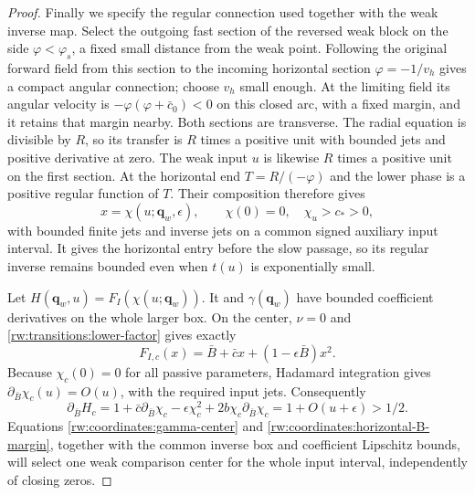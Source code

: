 \begin{proof}
Finally we specify the regular connection used together with the
weak inverse map. Select the outgoing fast section of the reversed
weak block on the side $\varphi<\varphi_s$, a fixed small distance
from the weak point. Following the original forward field from this
section to the incoming horizontal section $\varphi=-1/v_h$ gives
a compact angular connection; choose $v_h$ small enough. At the
limiting field its angular velocity is
$-\varphi(\varphi+\bar c_0)<0$ on this closed arc, with a fixed
margin, and it retains that margin nearby. Both sections are
transverse. The radial equation is divisible by $R$, so its transfer
is $R$ times a positive unit with bounded jets and positive derivative
at zero. The weak input $u$ is likewise $R$ times a positive unit on
the first section. At the horizontal end $T=R/(-\varphi)$ and the
lower phase is a positive regular function of $T$. Their composition
therefore gives
\begin{equation}\label{rw:coordinates:weak-connector}
 x=\chi(u;\mathbf q_w,\epsilon),\qquad
 \chi(0)=0,\quad \chi_u>c_*>0,
\end{equation}
with bounded finite jets and inverse jets on a common signed
auxiliary input interval. It gives the horizontal entry before the
slow passage, so its regular inverse remains bounded even when
$t(u)$ is exponentially small.

Let $H(\mathbf q_w,u)=F_I(\chi(u;\mathbf q_w))$.
It and $\gamma(\mathbf q_w)$ have bounded coefficient derivatives
on the whole larger box. On the center, $\nu=0$ and
\eqref{rw:transitions:lower-factor} gives exactly
\[
 F_{I,c}(x)=\bar B+\bar cx+(1-\epsilon\bar B)x^2.
\]
Because $\chi_c(0)=0$ for all passive parameters, Hadamard integration
gives $\partial_{\bar B}\chi_c(u)=O(u)$, with the required input
jets. Consequently
\begin{equation}\label{rw:coordinates:horizontal-B-margin}
 \partial_{\bar B}H_c
 =1+\bar c\partial_{\bar B}\chi_c-\epsilon\chi_c^2
       +2b\chi_c\partial_{\bar B}\chi_c
 =1+O(u+\epsilon)>1/2.
\end{equation}
Equations \eqref{rw:coordinates:gamma-center} and
\eqref{rw:coordinates:horizontal-B-margin}, together with the common
inverse box and coefficient Lipschitz bounds, will select one weak
comparison center for the whole input interval, independently of
closing zeros.
\end{proof}

